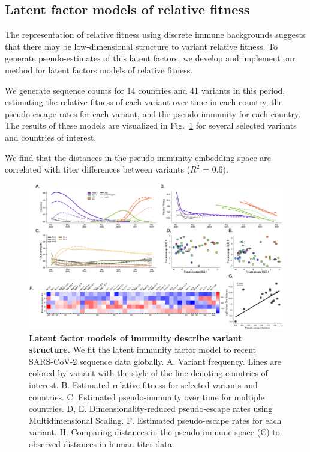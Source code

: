 \documentclass[11pt,oneside,letterpaper]{article}
\begin{document}
\subsection*{Latent factor models of relative fitness}

The representation of relative fitness using discrete immune backgrounds suggests that there may be low-dimensional structure to variant relative fitness.
To generate pseudo-estimates of this latent factors, we develop and implement our method for latent factors models of relative fitness.

We generate sequence counts for 14 countries and 41 variants in this period, estimating the relative fitness of each variant over time in each country, the pseudo-escape rates for each variant, and the pseudo-immunity for each country.
The results of these models are visualized in Fig.~\ref{fig:latent_immune} for several selected variants and countries of interest.

We find that the distances in the pseudo-immunity embedding space are correlated with titer differences between variants ($R^2$ = 0.6).

\begin{figure}[h]
    \centering
    \includegraphics[width=0.8\linewidth]{./figures/latent_immune.png}
    \caption{\textbf{Latent factor models of immunity describe variant structure.}
        We fit the latent immunity factor model to recent SARS-CoV-2 sequence data globally.
        A. Variant frequency. Lines are colored by variant with the style of the line denoting countries of interest.
        B. Estimated relative fitness for selected variants and countries.
        C. Estimated pseudo-immunity over time for multiple countries.
        D, E. Dimensionality-reduced pseudo-escape rates using Multidimensional Scaling.
        F. Estimated pseudo-escape rates for each variant.
        H. Comparing distances in the pseudo-immune space (C) to observed distances in human titer data.
    }
\label{fig:latent_immune}
\end{figure}
\end{document}
